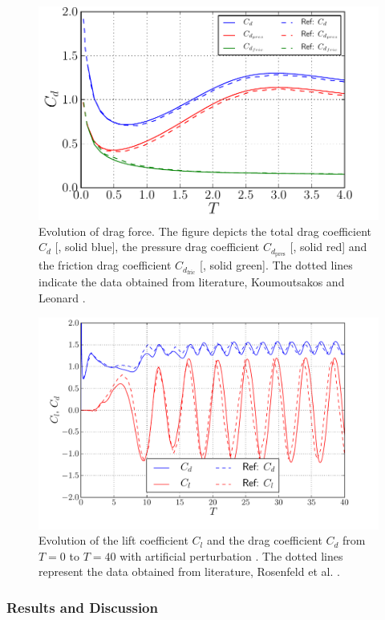 	\begin{figure}[p]
	\centering
	\includegraphics[width=0.7\linewidth]{./figures/eulerian/ISC_dragEvolution2.pdf}
	\caption{Evolution of drag force. The figure depicts the total drag coefficient $C_d$ [{\color{plotBlue}{---}}, solid blue], the pressure drag coefficient $C_{d_{\mathrm{pres}}}$ [{\color{plotRed}{---}}, solid red] and the friction drag coefficient $C_{d_{\mathrm{fric}}}$ [{\color{plotGreen}{---}}, solid green]. The dotted lines indicate the data obtained from literature, Koumoutsakos and Leonard \cite{Koumoutsakos1995a}.}
	\label{fig:ISC_dragEvolution}
	\end{figure}
	
	\begin{figure}[p]
	\centering
	\includegraphics[width=0.7\linewidth]{./figures/eulerian/ISC_LongRun_dragLiftEvolution2.pdf}
	\caption{Evolution of the lift coefficient $C_l$ and the drag coefficient $C_d$ from $T=0$ to $T=40$ with artificial perturbation \cite{Lecointe1984}. The dotted lines represent the data obtained from literature, Rosenfeld et al. \cite{MosheRosenFeldDochanKwak1991}.}
	\label{fig:ISC_LongRun_dragLiftEvolution}
	\end{figure}	

\subsubsection*{Results and Discussion}

